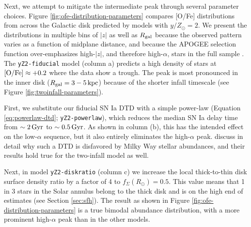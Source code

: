 \documentclass[twocolumn,twocolappendix,linenumbers]{aastex631}
\newcommand{\mathOFe}{{\rm [O/Fe]}}
\newcommand{\yZ}[1]{$y/Z_\odot=#1$}
\newcommand{\kpc}{\,{\rm kpc}}
\begin{document}
Next, we attempt to mitigate the intermediate peak through several parameter choices.
Figure \ref{fig:ofe-distribution-parameters} compares [O/Fe] distributions from across the Galactic disk predicted by models with \yZ{2}. We present the distributions in multiple bins of $|z|$ as well as $R_{\rm gal}$ because the observed pattern varies as a function of midplane distance, and because the APOGEE selection function over-emphasizes high-$|z|$, and therefore high-$\alpha$, stars in the full sample \citep[see Figure 5 from][]{vincenzo_distribution_2021}. The {\tt yZ2-fiducial} model (column a) predicts a high density of stars at $\mathOFe\approx+0.2$ where the data show a trough. The peak is most pronounced in the inner disk ($R_{\rm gal}=3-5\kpc$) because of the shorter infall timescale (see Figure \ref{fig:twoinfall-parameters}).

First, we substitute our fiducial SN Ia DTD with a simple power-law (Equation \ref{eq:powerlaw-dtd}; {\tt yZ2-powerlaw}),
which reduces the median SN Ia delay time from $\sim2\,{\rm Gyr}$ to $\sim0.5\,{\rm Gyr}$. As shown in column (b), this has the intended effect on the low-$\alpha$ sequence, but it also entirely eliminates the high-$\alpha$ peak. \citet{dubay_galactic_2024} discuss in detail why such a DTD is disfavored by Milky Way stellar abundances, and their results hold true for the two-infall model as well.

Next, in model {\tt yZ2-diskratio} (column c) we increase the local thick-to-thin disk surface density ratio by a factor of 4 to $f_\Sigma(R_\odot)=0.5$. This value means that 1 in 3 stars in the Solar annulus belong to the thick disk and is on the high end of estimates (see Section \ref{sec:sfh}). The result as shown in Figure \ref{fig:ofe-distribution-parameters} is a true bimodal abundance distribution, with a more prominent high-$\alpha$ peak than in the other models.
\end{document}
